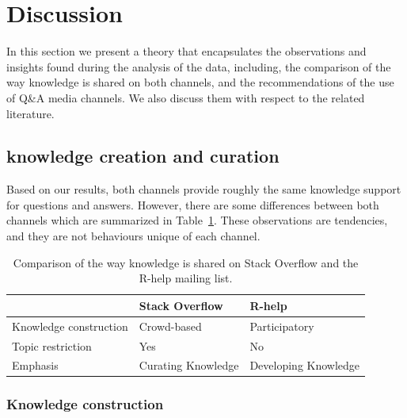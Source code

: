 
\section{Discussion}
\label{cha:theory}

    In this section we present a theory that encapsulates the observations and insights found during the analysis of the data, including, the comparison of the way knowledge is shared on both channels, and the recommendations of the use of Q\&A media channels.
    We also discuss them with respect to the related literature.

\subsection{knowledge creation and curation}

    Based on our results, both channels provide roughly the same knowledge support for questions and answers.
    However, there are some differences between both channels which are summarized in Table~\ref{table:constrat}.
    These observations are tendencies, and they are not behaviours unique of each channel.

    \begin{table}[!htb]
      \centering
      \caption{Comparison of the way knowledge is shared on Stack Overflow and the R-help mailing list.}
      \label{table:constrat}
      \begin{small}
        \setlength{\tabcolsep}{5pt}
        \begin{tabular}{@{}lll@{}}
          \toprule
          \textbf{}      & \textbf{Stack Overflow} & \textbf{R-help}\\
          \midrule
          Knowledge construction & Crowd-based             & Participatory \\
          Topic restriction      & Yes & No \\
          Emphasis & Curating Knowledge & Developing Knowledge \\ 
          \bottomrule
        \end{tabular}
      \end{small}
    \end{table}

\subsubsection{Knowledge construction}

